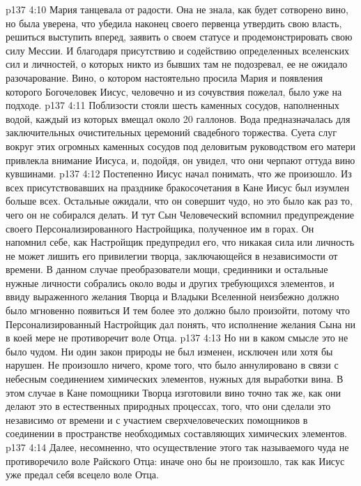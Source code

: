 \vs p137 4:10 Мария танцевала от радости. Она не знала, как будет сотворено вино, но была уверена, что убедила наконец своего первенца утвердить свою власть, решиться выступить вперед, заявить о своем статусе и продемонстрировать свою силу Мессии. И благодаря присутствию и содействию определенных вселенских сил и личностей, о которых никто из бывших там не подозревал, ее не ожидало разочарование. Вино, о котором настоятельно просила Мария и появления которого Богочеловек Иисус, человечно и из сочувствия пожелал, было уже на подходе.
\vs p137 4:11 Поблизости стояли шесть каменных сосудов, наполненных водой, каждый из которых вмещал около 20 галлонов. Вода предназначалась для заключительных очистительных церемоний свадебного торжества. Суета слуг вокруг этих огромных каменных сосудов под деловитым руководством его матери привлекла внимание Иисуса, и, подойдя, он увидел, что они черпают оттуда вино кувшинами.
\vs p137 4:12 Постепенно Иисус начал понимать, что же произошло. Из всех присутствовавших на празднике бракосочетания в Кане Иисус был изумлен больше всех. Остальные ожидали, что он совершит чудо, но это было как раз то, чего он не собирался делать. И тут Сын Человеческий вспомнил предупреждение своего Персонализированного Настройщика, полученное им в горах. Он напомнил себе, как Настройщик предупредил его, что никакая сила или личность не может лишить его привилегии творца, заключающейся в независимости от времени. В данном случае преобразователи мощи, срединники и остальные нужные личности собрались около воды и других требующихся элементов, и ввиду выраженного желания Творца и Владыки Вселенной неизбежно должно было мгновенно появиться  И тем более это должно было произойти, потому что Персонализированный Настройщик дал понять, что исполнение желания Сына ни в коей мере не противоречит воле Отца.
\vs p137 4:13 Но ни в каком смысле это не было чудом. Ни один закон природы не был изменен, исключен или хотя бы нарушен. Не произошло ничего, кроме того, что было аннулировано  в связи с небесным соединением химических элементов, нужных для выработки вина. В этом случае в Кане помощники Творца изготовили вино точно так же, как они делают это в естественных природных процессах,  того, что они сделали это независимо от времени и с участием сверхчеловеческих помощников в соединении в пространстве необходимых составляющих химических элементов.
\vs p137 4:14 Далее, несомненно, что осуществление этого так называемого чуда не противоречило воле Райского Отца: иначе оно бы не произошло, так как Иисус уже предал себя всецело воле Отца.
